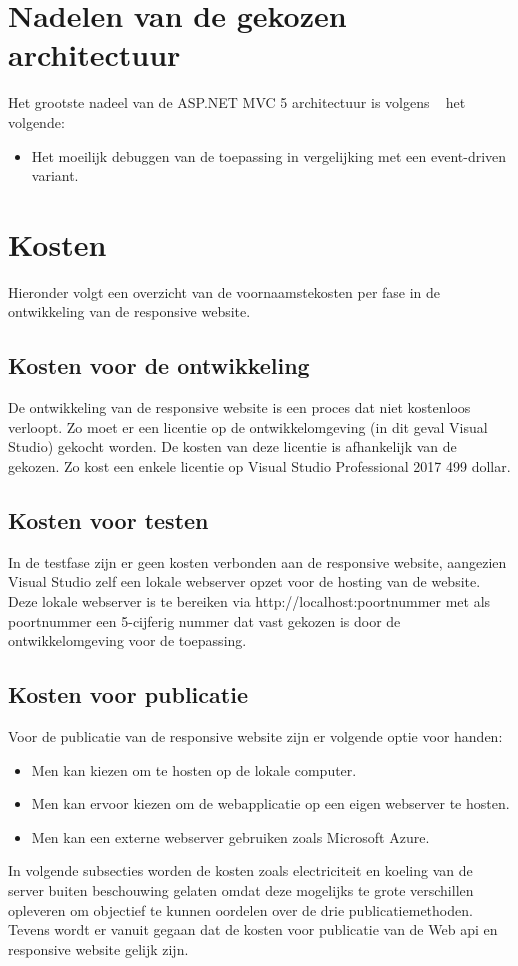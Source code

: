 \section{Nadelen van de gekozen architectuur}
Het grootste nadeel van de ASP.NET MVC 5 architectuur is volgens ~\cite{hasaspnetcorekilledwebforms2017} het volgende:
\begin{itemize}
  \item Het moeilijk debuggen van de toepassing in vergelijking met een event-driven variant.
\end{itemize}

\section{Kosten}
Hieronder volgt een overzicht van de voornaamstekosten per fase in de ontwikkeling van de responsive website.
\subsection{Kosten voor de ontwikkeling}
De ontwikkeling van de responsive website is een proces dat niet kostenloos verloopt. Zo moet er een licentie op de ontwikkelomgeving (in dit geval Visual Studio) gekocht worden.
De kosten van deze licentie is afhankelijk van de gekozen. Zo kost een enkele licentie op Visual Studio Professional 2017 499 dollar.

\subsection{Kosten voor testen}
In de testfase zijn er geen kosten verbonden aan de responsive website, aangezien Visual Studio zelf een lokale webserver opzet
voor de hosting van de website. Deze lokale webserver is te bereiken via http://localhost:poortnummer met als poortnummer een
5-cijferig nummer dat vast gekozen is door de ontwikkelomgeving voor de toepassing.
\subsection{Kosten voor publicatie}
Voor de publicatie van de responsive website zijn er volgende optie voor handen:
\begin{itemize}
  \item Men kan kiezen om te hosten op de lokale computer.
  \item Men kan ervoor kiezen om de webapplicatie op een eigen webserver te hosten.
  \item Men kan een externe webserver gebruiken zoals Microsoft Azure.
\end{itemize}
In volgende subsecties worden de kosten zoals electriciteit en koeling van de server buiten beschouwing gelaten omdat deze
mogelijks te grote verschillen opleveren om objectief te kunnen oordelen over de drie publicatiemethoden. Tevens wordt er vanuit
gegaan dat de kosten voor publicatie van de Web api en responsive website gelijk zijn.

